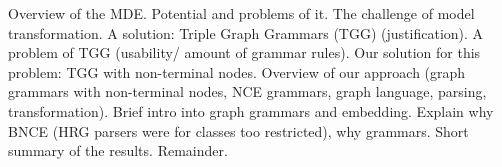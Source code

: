 
Overview of the MDE. Potential and problems of it. The challenge of model transformation. A solution: Triple Graph Grammars (TGG) (justification). A problem of TGG (usability/ amount of grammar rules). Our solution for this problem: TGG with non-terminal nodes. Overview of our approach (graph grammars with non-terminal nodes, NCE grammars, graph language, parsing, transformation). Brief intro into graph grammars and embedding. Explain why BNCE (HRG parsers were for classes too restricted), why grammars. Short summary of the results. Remainder.


